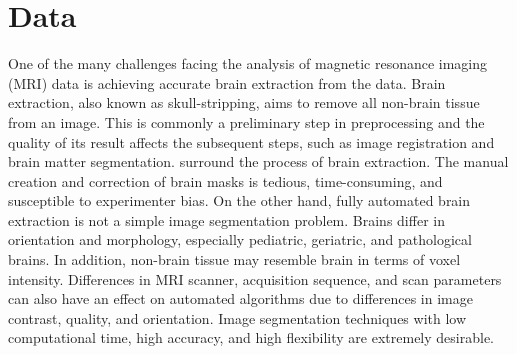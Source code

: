 \section*{Data \DIFdelbegin {}\DIFdelend \DIFaddbegin {}\DIFaddend }

\par One of the many challenges facing the analysis of magnetic resonance imaging (MRI) data is achieving accurate brain extraction from the data. Brain extraction, also known as skull-stripping, aims to remove all non-brain tissue from an image. This is commonly a preliminary step in preprocessing and the quality of its result affects the subsequent steps, such as image registration and brain matter segmentation. \DIFdelbegin {}\DIFdelend \DIFaddbegin {}\DIFaddend surround the process of brain extraction. The manual creation and correction of brain masks is tedious, time-consuming, and susceptible to experimenter bias. On the other hand, fully automated brain extraction is not a simple image segmentation problem. Brains \DIFdelbegin {}\DIFdelend differ in orientation and morphology, especially \DIFdelbegin {}\DIFdelend pediatric, geriatric, and pathological brains. In addition, non-brain tissue may resemble brain in terms of voxel intensity. Differences in MRI scanner, acquisition sequence, and scan parameters can also have an effect on automated algorithms due to differences in image contrast, quality, and orientation. Image segmentation techniques with low computational time, high accuracy, and high flexibility are extremely desirable.
\DIFaddbegin 

